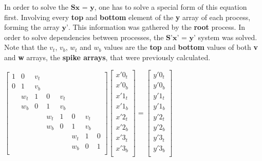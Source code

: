 \documentclass[12pt]{article}
\begin{document}
\par In order to solve the $\textbf{Sx = y}$, one has to solve a special form of this equation first. Involving every \textbf{top} and \textbf{bottom} element of the \textbf{y} array of each process, forming the array $\textbf{y'}$. This information was gathered by the \textbf{root} process. In order to solve dependencies between processes, the $\textbf{S'x' = y'}$ system was solved. Note that the $v_t$,  $v_b$, $w_t$ and $w_b$ values are the \textbf{top} and \textbf{bottom} values of both \textbf{v} and \textbf{w} arrays, the \textbf{spike arrays}, that were previously calculated.
\newline
\begin{center}
$
\begin{bmatrix}
    1 & 0 & v_t &  &  &  &  & \\
    0 & 1 & v_b &  &  &  &  &  \\
     & w_t & 1 & 0 & v_t &  &  &  \\
   	 & w_b & 0 & 1 & v_b &  &  & \\ 
   	 &  &  & w_t & 1 & 0 & v_t &  \\
   	 &  &  & w_b & 0 & 1 & v_b &  \\
   	 &  &  &  &  & w_t & 1 & 0 \\
   	 &  &  &  &  & w_b & 0 & 1 \\
\end{bmatrix}
\begin{bmatrix}
    x'0_t \\
    x'0_b \\
    x'1_t \\
    x'1_b \\
    x'2_t \\
    x'2_b \\
    x'3_t \\
    x'3_b \\
\end{bmatrix}
=
\begin{bmatrix}
    y'0_t \\
    y'0_b \\
    y'1_t \\
    y'1_b \\
    y'2_t \\
    y'2_b \\
    y'3_t \\
    y'3_b \\
\end{bmatrix}
$
\end{center}
\end{document}
